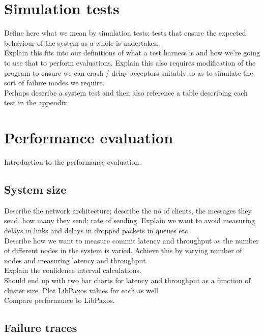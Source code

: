 \section{Simulation tests}

Define here what we mean by simulation tests: tests that ensure the expected behaviour of the system as a whole is undertaken. \\

Explain this fits into our definitions of what a test harness is and how we're going to use that to perform evaluations. Explain this also requires modification of the program to ensure we can crash / delay acceptors suitably so as to simulate the sort of failure modes we require. \\

Perhaps describe a system test and then also reference a table describing each test in the appendix. \\

\section{Performance evaluation}

Introduction to the performance evaluation.

\subsection{System size}

Describe the network architecture; describe the no of clients, the messages they send, how many they send; rate of sending. Explain we want to avoid measuring delays in links and delays in dropped packets in queues etc. \\

Describe how we want to measure commit latency and throughput as the number of different nodes in the system is varied. Achieve this by varying number of nodes and measuring latency and throughput. \\

Explain the confidence interval calculations. \\

{\color{blue}Should end up with two bar charts for latency and throughput as a function of cluster size. Plot LibPaxos values for each as well} \\

Compare performance to LibPaxos.

\subsection{Failure traces}

